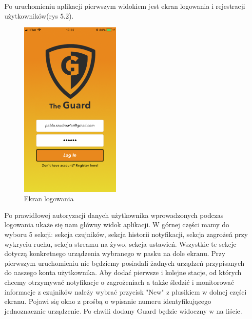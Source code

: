 Po uruchomieniu aplikacji pierwszym widokiem jest ekran logowania i rejestracji użytkowników(rys 5.2). 
\begin{figure}[h]
	\centering
	\includegraphics[width=5cm]{login.png}
	\caption{Ekran logowania}
\end{figure}
Po prawidłowej autoryzacji danych użytkownika wprowadzonych podczas logowania ukaże się nam główny widok aplikacji. W górnej części mamy do wyboru 5 sekcji:
sekcja czujników, sekcja historii notyfikacji, sekcja zagrożeń przy wykryciu ruchu, sekcja streamu na żywo, sekcja ustawień. Wszystkie te sekcje dotyczą konkretnego urządzenia wybranego w pasku na dole ekranu. Przy pierwszym uruchomieniu nie będziemy posiadali żadnych urządzeń przypisanych do naszego konta użytkownika. Aby dodać pierwsze i kolejne stacje, od których chcemy otrzymywać notyfikacje o zagrożeniach a także śledzić i monitorować informacje z czujników należy wybrać przycisk "New" z plusikiem w dolnej części ekranu. Pojawi się okno z prośbą o wpisanie numeru identyfikującego jednoznacznie urządzenie. Po chwili dodany Guard będzie widoczny w na liście.


